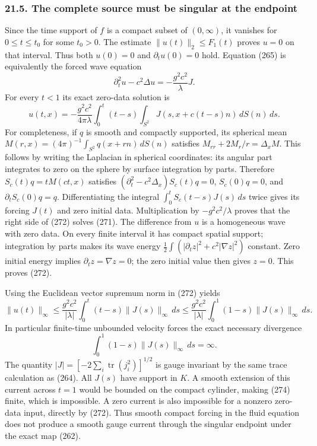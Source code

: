 \documentclass[
  11pt,
]{article}
\begin{document}
\subsubsection{21.5. The complete source must be singular at the
endpoint}\label{the-complete-source-must-be-singular-at-the-endpoint}

Since the time support of \(f\) is a compact subset of \((0,\infty)\),
it vanishes for \(0\le t\le t_0\) for some \(t_0>0\). The estimate
\(\|u(t)\|_2\le F_1(t)\) proves \(u=0\) on that interval. Thus both
\(u(0)=0\) and \(\partial_tu(0)=0\) hold. Equation (265) is equivalently
the forced wave equation \[
 \partial_t^2u-c^2\Delta u
       =-\frac{g^2c^2}{\lambda}J .
 \tag{271}
\] For every \(t<1\) its exact zero-data solution is \[
 u(t,x)=-\frac{g^2c^2}{4\pi\lambda}
       \int_0^t(t-s)\int_{S^2}
                J(s,x+c(t-s)n)\,dS(n)\,ds .
 \tag{272}
\] For completeness, if \(q\) is smooth and compactly supported, its
spherical mean \(M(r,x)=(4\pi)^{-1}\int_{S^2}q(x+rn)\,dS(n)\) satisfies
\(M_{rr}+2M_r/r=\Delta_xM\). This follows by writing the Laplacian in
spherical coordinates: its angular part integrates to zero on the sphere
by surface integration by parts. Therefore \(S_c(t)q=tM(ct,x)\)
satisfies \((\partial_t^2-c^2\Delta_x)S_c(t)q=0\), \(S_c(0)q=0\), and
\(\partial_tS_c(0)q=q\). Differentiating the integral
\(\int_0^t S_c(t-s)J(s)\,ds\) twice gives its forcing \(J(t)\) and zero
initial data. Multiplication by \(-g^2c^2/\lambda\) proves that the
right side of (272) solves (271). The difference from \(u\) is a
homogeneous wave with zero data. On every finite interval it has compact
spatial support; integration by parts makes its wave energy
\(\frac12\int(|\partial_tz|^2+c^2|\nabla z|^2)\) constant. Zero initial
energy implies \(\partial_tz=\nabla z=0\); the zero initial value then
gives \(z=0\). This proves (272).

Using the Euclidean vector supremum norm in (272) yields \[
 \|u(t)\|_\infty
 \le\frac{g^2c^2}{|\lambda|}
       \int_0^t(t-s)\|J(s)\|_\infty\,ds
 \le\frac{g^2c^2}{|\lambda|}
       \int_0^1(1-s)\|J(s)\|_\infty\,ds .
 \tag{273}
\] In particular finite-time unbounded velocity forces the exact
necessary divergence \[
 \int_0^1(1-s)\|J(s)\|_\infty\,ds=\infty .
 \tag{274}
\] The quantity \(|J|=[-2\sum_i\operatorname{tr}(j_i^2)]^{1/2}\) is
gauge invariant by the same trace calculation as (264). All \(J(s)\)
have support in \(K\). A smooth extension of this current across \(t=1\)
would be bounded on the compact cylinder, making (274) finite, which is
impossible. A zero current is also impossible for a nonzero zero-data
input, directly by (272). Thus smooth compact forcing in the fluid
equation does not produce a smooth gauge current through the singular
endpoint under the exact map (262).
\end{document}
